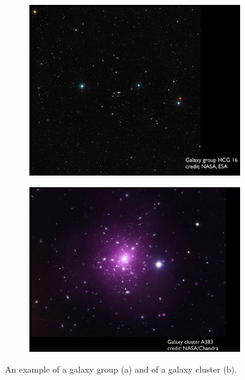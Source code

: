 \begin{figure}
	\centering
		\begin{subfigure}[b]{0.49\textwidth}
			\includegraphics[width=1\linewidth]{img/ch-01/galaxygroupHCG16.png}
			\caption{}
			\label{fig:galaxygroupHCG16}
		\end{subfigure}
		\begin{subfigure}[b]{0.49\textwidth}
			\includegraphics[width=1\linewidth]{img/ch-01/galaxyclusterA383.png}
			\caption{}
			\label{fig:galaxyclusterA383}
		\end{subfigure}
\caption{An example of a galaxy group (a) and of a galaxy cluster (b).}
\end{figure}

